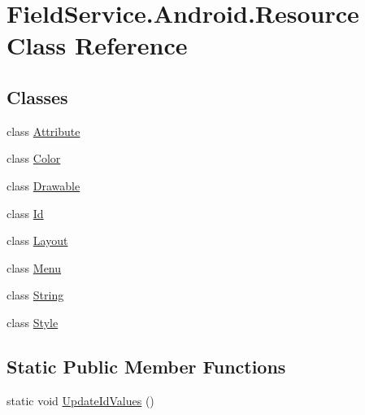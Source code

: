 \hypertarget{class_field_service_1_1_android_1_1_resource}{\section{Field\+Service.\+Android.\+Resource Class Reference}
\label{class_field_service_1_1_android_1_1_resource}
}
\subsection*{Classes}
\begin{DoxyCompactItemize}
\item 
class \hyperlink{class_field_service_1_1_android_1_1_resource_1_1_attribute}{Attribute}
\item 
class \hyperlink{class_field_service_1_1_android_1_1_resource_1_1_color}{Color}
\item 
class \hyperlink{class_field_service_1_1_android_1_1_resource_1_1_drawable}{Drawable}
\item 
class \hyperlink{class_field_service_1_1_android_1_1_resource_1_1_id}{Id}
\item 
class \hyperlink{class_field_service_1_1_android_1_1_resource_1_1_layout}{Layout}
\item 
class \hyperlink{class_field_service_1_1_android_1_1_resource_1_1_menu}{Menu}
\item 
class \hyperlink{class_field_service_1_1_android_1_1_resource_1_1_string}{String}
\item 
class \hyperlink{class_field_service_1_1_android_1_1_resource_1_1_style}{Style}
\end{DoxyCompactItemize}
\subsection*{Static Public Member Functions}
\begin{DoxyCompactItemize}
\item 
static void \hyperlink{class_field_service_1_1_android_1_1_resource_a36d7031f9d174ca253f7bc8011dc6294}{Update\+Id\+Values} ()
\end{DoxyCompactItemize}


